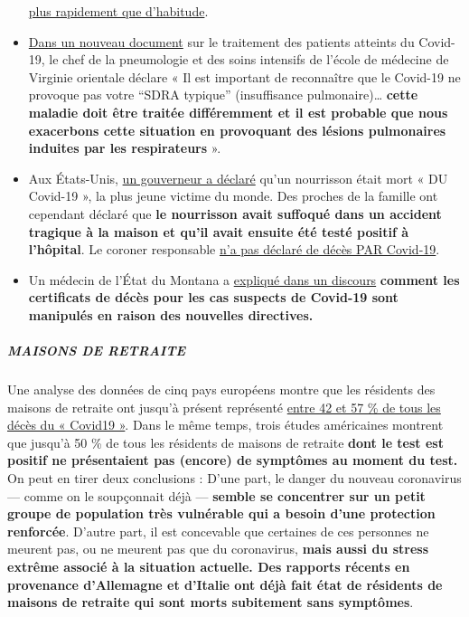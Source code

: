 \begin{itemize}
  \href{https://archive.is/7w2XE}{plus rapidement que d'habitude}.
\item
  \href{https://www.evms.edu/media/evms_public/departments/internal_medicine/EVMS_Critical_Care_COVID-19_Protocol.pdf}{Dans
  un nouveau document} sur le traitement des patients atteints du
  Covid-19, le chef de la pneumologie et des soins intensifs de l'école
  de médecine de Virginie orientale déclare « Il est important de
  reconnaître que le Covid-19 ne provoque pas votre ``SDRA typique''
  (insuffisance pulmonaire)\ldots{} \textbf{cette maladie doit être
  traitée différemment et il est probable que nous exacerbons cette
  situation en provoquant des lésions pulmonaires induites par les
  respirateurs} ».
\item
  Aux États-Unis,
  \href{https://www.washingtonexaminer.com/news/candace-owens-accuses-connecticut-governor-of-lying-about-coronavirus-death-calls-for-resignation}{un
  gouverneur a déclaré} qu'un nourrisson était mort « DU Covid-19 », la
  plus jeune victime du monde. Des proches de la famille ont cependant
  déclaré que \textbf{le nourrisson avait suffoqué dans un accident
  tragique à la maison et qu'il avait ensuite été testé positif à
  l'hôpital}. Le coroner responsable
  \href{https://www.dailymail.co.uk/news/article-8193487/Coroner-refuses-rule-COVID-19-cause-death-six-week-old-Connecticut-baby.html}{n'a
  pas déclaré de décès PAR Covid-19}.
\item
  Un médecin de l'État du Montana a
  \href{https://www.youtube.com/watch?v=V0lIWZpiRU0}{expliqué dans un
  discours} \textbf{comment les certificats de décès pour les cas
  suspects de Covid-19 sont manipulés en raison des nouvelles
  directives.}
\end{itemize}

\hypertarget{maisons-de-retraite}{%
\subparagraph{\texorpdfstring{\textbf{MAISONS DE
RETRAITE}}{MAISONS DE RETRAITE}}\label{maisons-de-retraite}}

Une analyse des données de cinq pays européens montre que les résidents
des maisons de retraite ont jusqu'à présent représenté
\href{https://ltccovid.org/2020/04/12/mortality-associated-with-covid-19-outbreaks-in-care-homes-early-international-evidence/}{entre
42 et 57 \% de tous les décès du « Covid19 »}. Dans le même temps, trois
études américaines montrent que jusqu'à 50 \% de tous les résidents de
maisons de retraite \textbf{dont le test est positif ne présentaient pas
(encore) de symptômes au moment du test.} On peut en tirer deux
conclusions : D'une part, le danger du nouveau coronavirus --- comme on
le soupçonnait déjà --- \textbf{semble se concentrer sur un petit groupe
de population très vulnérable qui a besoin d'une protection renforcée}.
D'autre part, il est concevable que certaines de ces personnes ne
meurent pas, ou ne meurent pas que du coronavirus, \textbf{mais aussi du
stress extrême associé à la situation actuelle. Des rapports récents en
provenance d'Allemagne et d'Italie ont déjà fait état de résidents de
maisons de retraite qui sont morts subitement sans symptômes}.

